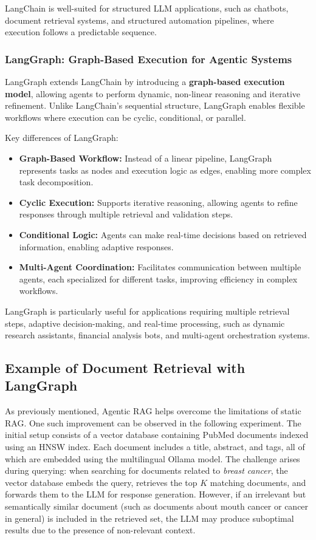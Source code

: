 LangChain is well-suited for structured LLM applications, such as chatbots, document retrieval systems, and structured automation pipelines, where execution follows a predictable sequence.

\subsubsection{LangGraph: Graph-Based Execution for Agentic Systems}

LangGraph extends LangChain by introducing a \textbf{graph-based execution model}, allowing agents to perform dynamic, non-linear reasoning and iterative refinement. Unlike LangChain’s sequential structure, LangGraph enables flexible workflows where execution can be cyclic, conditional, or parallel.

Key differences of LangGraph:
\begin{itemize}
    \item \textbf{Graph-Based Workflow:} Instead of a linear pipeline, LangGraph represents tasks as nodes and execution logic as edges, enabling more complex task decomposition.
    \item \textbf{Cyclic Execution:} Supports iterative reasoning, allowing agents to refine responses through multiple retrieval and validation steps.
    \item \textbf{Conditional Logic:} Agents can make real-time decisions based on retrieved information, enabling adaptive responses.
    \item \textbf{Multi-Agent Coordination:} Facilitates communication between multiple agents, each specialized for different tasks, improving efficiency in complex workflows.
\end{itemize}

LangGraph is particularly useful for applications requiring multiple retrieval steps, adaptive decision-making, and real-time processing, such as dynamic research assistants, financial analysis bots, and multi-agent orchestration systems.

\subsection{Example of Document Retrieval with LangGraph}
As previously mentioned, Agentic RAG helps overcome the limitations of static RAG. One such improvement can be observed in the following experiment. The initial setup consists of a vector database containing PubMed documents indexed using an HNSW index. Each document includes a title, abstract, and tags, all of which are embedded using the multilingual Ollama model. The challenge arises during querying: when searching for documents related to \textit{breast cancer}, the vector database embeds the query, retrieves the top $K$ matching documents, and forwards them to the LLM for response generation. However, if an irrelevant but semantically similar document (such as documents about mouth cancer or cancer in general) is included in the retrieved set, the LLM may produce suboptimal results due to the presence of non-relevant context.

